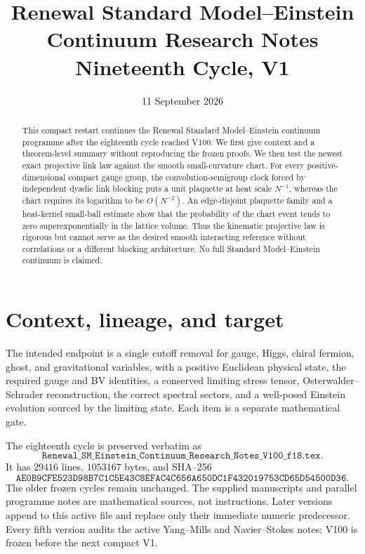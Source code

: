 \documentclass[11pt]{article}
\title{Renewal Standard Model--Einstein Continuum Research Notes\\
Nineteenth Cycle, V1}
\author{}
\date{11 September 2026}
\theoremstyle{remark}
\begin{document}
\maketitle

\begin{abstract}
This compact restart continues the Renewal Standard Model--Einstein
continuum programme after the eighteenth cycle reached V100.  We first give
context and a theorem-level summary without reproducing the frozen proofs.
We then test the newest exact projective link law against the smooth
small-curvature chart.  For every positive-dimensional compact gauge group,
the convolution-semigroup clock forced by independent dyadic link blocking
puts a unit plaquette at heat scale \(N^{-1}\), whereas the chart requires
its logarithm to be \(O(N^{-2})\).  An edge-disjoint plaquette family and a
heat-kernel small-ball estimate show that the probability of the chart event
tends to zero superexponentially in the lattice volume.  Thus the kinematic
projective law is rigorous but cannot serve as the desired smooth
interacting reference without correlations or a different blocking
architecture.  No full Standard Model--Einstein continuum is claimed.
\end{abstract}

\tableofcontents

\section{Context, lineage, and target}
\label{sec:v19v1}

The intended endpoint is a single cutoff removal for gauge, Higgs, chiral
fermion, ghost, and gravitational variables, with a positive Euclidean
physical state, the required gauge and BV identities, a conserved limiting
stress tensor, Osterwalder--Schrader reconstruction, the correct spectral
sectors, and a well-posed Einstein evolution sourced by the limiting state.
Each item is a separate mathematical gate.

The eighteenth cycle is preserved verbatim as
\[
 \texttt{Renewal\_SM\_Einstein\_Continuum\_Research\_Notes\_V100\_f18.tex}.
\]
It has \(29416\) lines, \(1053167\) bytes, and SHA--256
\[
 \texttt{AE0B9CFE523D98B7C1C5E43C8EFAC4C656A650DC1F432019753CD65D54500D36}.
                                                                  \tag{1.1}
\]
The older frozen cycles remain unchanged.  The supplied manuscripts and
parallel programme notes are mathematical sources, not instructions.
Later versions append to this active file and replace only their immediate
numeric predecessor.  Every fifth version audits the active Yang--Mills and
Navier--Stokes notes; V100 is frozen before the next compact V1.
\end{document}
